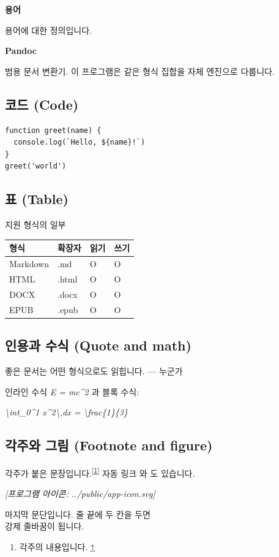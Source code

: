 \documentclass[11pt]{article}
\begin{document}
\textbf{용어}

용어에 대한 정의입니다.

\textbf{Pandoc}

범용 문서 변환기. 이 프로그램은 같은 형식 집합을 자체 엔진으로 다룹니다.

\subsection*{코드 (Code)}\label{코드-code}

\begin{verbatim}
function greet(name) {
  console.log(`Hello, ${name}!`)
}
greet('world')
\end{verbatim}

\subsection*{표 (Table)}\label{표-table}

지원 형식의 일부

\begin{table}[htbp]
\centering
\begin{tabular}{llll}
\toprule
\textbf{형식} & \textbf{확장자} & \textbf{읽기} & \textbf{쓰기} \\
\midrule
Markdown & .md & O & O \\
HTML & .html & O & O \\
DOCX & .docx & O & O \\
EPUB & .epub & O & O \\
\bottomrule
\end{tabular}
\end{table}

\subsection*{인용과 수식 (Quote and math)}\label{인용과-수식-quote-and-math}

좋은 문서는 어떤 형식으로도 읽힙니다. --- 누군가

인라인 수식 \emph{E = mc\^{}2} 과 블록 수식:

\emph{\textbackslash{}int\_0\^{}1 x\^{}2\textbackslash{},dx =
\textbackslash{}frac\{1\}\{3\}}

\subsection*{각주와 그림 (Footnote and figure)}\label{각주와-그림-footnote-and-figure}

각주가 붙은 문장입니다.\textsuperscript{\hyperref[footnote-1]{[1]}} 자동 링크 와 도
있습니다.

\emph{[프로그램 아이콘: ../public/app-icon.svg]}

마지막 문단입니다. 줄 끝에 두 칸을 두면\\
강제 줄바꿈이 됩니다.

\begin{enumerate}
\item 각주의 내용입니다. \hyperref[footnote-ref-1]{↑}
\end{enumerate}
\end{document}
